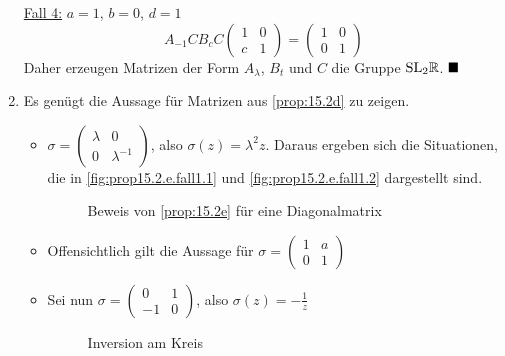 \begin{beweis}
\begin{enumerate}[label=\alph*)]
              \underline{Fall 4:} $a = 1$, $b=0$, $d=1$\\
              \[A_{-1} C B_c C \begin{pmatrix}1 & 0 \\ c & 1\end{pmatrix} = \begin{pmatrix}1 & 0 \\ 0 & 1\end{pmatrix}\]
              Daher erzeugen Matrizen der Form $A_{\lambda}$, $B_t$ und $C$
              die Gruppe $\mathrm{SL}_2{\mathbb{R}}$. $\qed$
        \item Es genügt die Aussage für Matrizen aus \cref{prop:15.2d}
              zu zeigen.
            \begin{itemize}
                \item $\sigma = \begin{pmatrix}\lambda & 0\\ 0 & \lambda^{-1}\end{pmatrix}$, also $\sigma(z) = \lambda^2 z$.
                      Daraus ergeben sich die Situationen, die in \cref{fig:prop15.2.e.fall1.1} und
                      \cref{fig:prop15.2.e.fall1.2} dargestellt sind.
                    \begin{figure}[ht]
                        \centering
                        \subfloat[Fall 1]{
                            \resizebox{0.45\linewidth}{!}{}
                            \label{fig:prop15.2.e.fall1.1}
                        }%
                        \label{fig:prop15.2.e.fall1.0}
                        \caption{Beweis von \cref{prop:15.2e} für eine Diagonalmatrix}
                    \end{figure}
                \item Offensichtlich gilt die Aussage für $\sigma = \begin{pmatrix}1 & a\\0 & 1\end{pmatrix}$
                \item Sei nun $\sigma = \begin{pmatrix}0 & 1\\-1 & 0\end{pmatrix}$, also $\sigma(z) = - \frac{1}{z}$
                    \begin{figure}[htp]
                        \centering
                        
                        \caption{Inversion am Kreis}
                        \label{fig:inversion-am-kreis}
                    \end{figure}
            \end{itemize}
    \end{enumerate}
\end{beweis}


